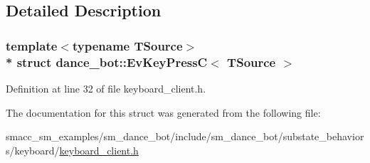 \subsection{Detailed Description}
\subsubsection*{template$<$typename T\+Source$>$\\*
struct dance\+\_\+bot\+::\+Ev\+Key\+Press\+C$<$ T\+Source $>$}



Definition at line 32 of file keyboard\+\_\+client.\+h.



The documentation for this struct was generated from the following file\+:\begin{DoxyCompactItemize}
\item 
smacc\+\_\+sm\+\_\+examples/sm\+\_\+dance\+\_\+bot/include/sm\+\_\+dance\+\_\+bot/substate\+\_\+behaviors/keyboard/\hyperlink{keyboard__client_8h}{keyboard\+\_\+client.\+h}\end{DoxyCompactItemize}
